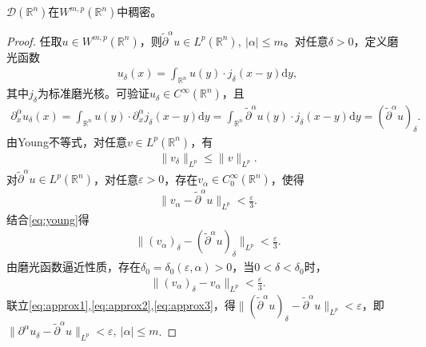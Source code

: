 \documentclass[../../main.tex]{subfiles}%
\begin{document}
\begin{theorem}
$\mathscr{D}(\mathbb{R}^{n})$在$W^{m,p}(\mathbb{R}^{n})$中稠密。
\end{theorem}

\begin{proof}

任取$u\in W^{m,p}(\mathbb{R}^{n})$，则$\widetilde{\partial}^{\alpha}u\in L^{p}(\mathbb{R}^{n}),\ |\alpha|\leqslant m$。对任意$\delta>0$，定义磨光函数
\begin{align}
u_{\delta}(x)=\int_{\mathbb{R}^{n}}u(y)\cdot j_{\delta}(x-y)\mathrm{d}y,\label{eq:mollify}
\end{align}
其中$j_{\delta}$为标准磨光核。可验证$u_{\delta}\in C^{\infty}(\mathbb{R}^{n})$，且
\begin{align*}
\partial_{x}^{\alpha}u_{\delta}(x)=\int_{\mathbb{R}^{n}}u(y)\cdot\partial_{x}^{\alpha}j_{\delta}(x-y)\mathrm{d}y=\int_{\mathbb{R}^{n}}\widetilde{\partial}^{\alpha}u(y)\cdot j_{\delta}(x-y)\mathrm{d}y=(\widetilde{\partial}^{\alpha}u)_{\delta}.
\end{align*}
由Young不等式，对任意$v\in L^{p}(\mathbb{R}^{n})$，有
\begin{align}
\|v_{\delta}\|_{L^{p}}\leqslant\|v\|_{L^{p}}.\label{eq:young}
\end{align}
对$\widetilde{\partial}^{\alpha}u\in L^{p}(\mathbb{R}^{n})$，对任意$\varepsilon>0$，存在$v_{\alpha}\in C_{0}^{\infty}(\mathbb{R}^{n})$，使得
\begin{align}
\|v_{\alpha}-\widetilde{\partial}^{\alpha}u\|_{L^{p}}<\frac{\varepsilon}{3}.\label{eq:approx1}
\end{align}
结合\eqref{eq:young}得
\begin{align}
\|(v_{\alpha})_{\delta}-(\widetilde{\partial}^{\alpha}u)_{\delta}\|_{L^{p}}<\frac{\varepsilon}{3}.\label{eq:approx2}
\end{align}
由磨光函数逼近性质，存在$\delta_{0}=\delta_{0}(\varepsilon,\alpha)>0$，当$0<\delta<\delta_{0}$时，
\begin{align}
\|(v_{\alpha})_{\delta}-v_{\alpha}\|_{L^{p}}<\frac{\varepsilon}{3}.\label{eq:approx3}
\end{align}
联立\eqref{eq:approx1},\eqref{eq:approx2},\eqref{eq:approx3}，得$\|(\widetilde{\partial}^{\alpha}u)_{\delta}-\widetilde{\partial}^{\alpha}u\|_{L^{p}}<\varepsilon$，即$\|\partial^{\alpha}u_{\delta}-\widetilde{\partial}^{\alpha}u\|_{L^{p}}<\varepsilon,\ |\alpha|\leqslant m$.

\end{proof}
\end{document}
